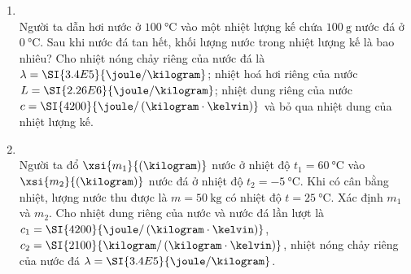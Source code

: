 \begin{enumerate}[label=\bfseries Câu \arabic*:, leftmargin=1.7cm]
\item {}\\
Người ta dẫn hơi nước ở $\SI{100}{\celsius}$ vào một nhiệt lượng kế chứa $\SI{100}{\gram}$ nước đá ở $\SI{0}{\celsius}$. Sau khi nước đá tan hết, khối lượng nước trong nhiệt lượng kế là bao nhiêu? Cho nhiệt nóng chảy riêng của nước đá là $\lambda=\SI{3.4E5}{\joule/\kilogram}$; nhiệt hoá hơi riêng của nước $L=\SI{2.26E6}{\joule/\kilogram}$; nhiệt dung riêng của nước $c=\SI{4200}{\joule/\left(\kilogram\cdot\kelvin\right)}$ và bỏ qua nhiệt dung của nhiệt lượng kế.

	\item {}\\
	Người ta đổ $\xsi{m_1}{\left(\kilogram\right)}$ nước ở nhiệt độ $t_1=\SI{60}{\celsius}$ vào $\xsi{m_2}{\left(\kilogram\right)}$ nước đá ở nhiệt độ $t_2=\SI{-5}{\celsius}$. Khi có cân bằng nhiệt, lượng nước thu được là $m=\SI{50}{\kilogram}$ có nhiệt độ $t=\SI{25}{\celsius}$. Xác định $m_1$ và $m_2$. Cho nhiệt dung riêng của nước và nước đá lần lượt là $c_1=\SI{4200}{\joule/\left(\kilogram\cdot\kelvin\right)}$, $c_2=\SI{2100}{\kilogram/\left(\kilogram\cdot\kelvin\right)}$, nhiệt nóng chảy riêng của nước đá $\lambda=\SI{3.4E5}{\joule/\kilogram}$.


\end{enumerate}
